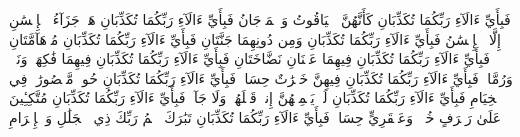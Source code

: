 فَبِأَيِّ ءَالَآءِ رَبِّكُمَا تُكَذِّبَانِ
كَأَنَّهُنَّ ٱلۡيَاقُوتُ وَٱلۡمَرۡجَانُ
فَبِأَيِّ ءَالَآءِ رَبِّكُمَا تُكَذِّبَانِ
هَلۡ جَزَآءُ ٱلۡإِحۡسَٰنِ إِلَّا ٱلۡإِحۡسَٰنُ
فَبِأَيِّ ءَالَآءِ رَبِّكُمَا تُكَذِّبَانِ
وَمِن دُونِهِمَا جَنَّتَانِ
فَبِأَيِّ ءَالَآءِ رَبِّكُمَا تُكَذِّبَانِ
مُدۡهَآمَّتَانِ
فَبِأَيِّ ءَالَآءِ رَبِّكُمَا تُكَذِّبَانِ
فِيهِمَا عَيۡنَانِ نَضَّاخَتَانِ
فَبِأَيِّ ءَالَآءِ رَبِّكُمَا تُكَذِّبَانِ
فِيهِمَا فَٰكِهَةٞ وَنَخۡلٞ وَرُمَّانٞ
فَبِأَيِّ ءَالَآءِ رَبِّكُمَا تُكَذِّبَانِ
فِيهِنَّ خَيۡرَٰتٌ حِسَانٞ
فَبِأَيِّ ءَالَآءِ رَبِّكُمَا تُكَذِّبَانِ
حُورٞ مَّقۡصُورَٰتٞ فِي ٱلۡخِيَامِ
فَبِأَيِّ ءَالَآءِ رَبِّكُمَا تُكَذِّبَانِ
لَمۡ يَطۡمِثۡهُنَّ إِنسٞ قَبۡلَهُمۡ وَلَا جَآنّٞ
فَبِأَيِّ ءَالَآءِ رَبِّكُمَا تُكَذِّبَانِ
مُتَّكِـِٔينَ عَلَىٰ رَفۡرَفٍ خُضۡرٖ وَعَبۡقَرِيٍّ حِسَانٖ
فَبِأَيِّ ءَالَآءِ رَبِّكُمَا تُكَذِّبَانِ
تَبَٰرَكَ ٱسۡمُ رَبِّكَ ذِي ٱلۡجَلَٰلِ وَٱلۡإِكۡرَامِ
